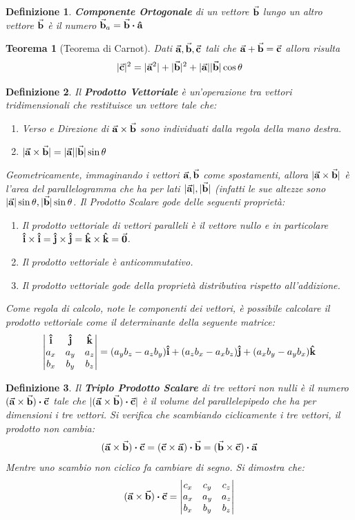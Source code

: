 \documentclass{article}
\newtheorem{thm}{Teorema}[section]
\newtheorem{defn}{Definizione}[section]
\renewcommand{\i}{\vu{i}}
\renewcommand{\j}{\vu{j}}
\renewcommand{\k}{\vu{k}}
\renewcommand{\a}{\va{a}}
\renewcommand{\b}{\va{b}}
\renewcommand{\c}{\va{c}}
\begin{document}
\begin{defn}
\textbf{Componente Ortogonale} di un vettore $\b$ lungo un altro vettore $\b$ è il numero $\b_a=\b\vdot\vu{a}$
\end{defn}

\begin{thm}[Teorema di Carnot]
Dati \(\a,\b,\c\) tali che \(\a+\b=\c\) allora risulta 
\[|\c|^2=|\a^2|+|\b|^2+|\a||\b|\cos\theta\]
\end{thm}

\begin{defn}
Il \textbf{Prodotto Vettoriale} è un'operazione tra vettori tridimensionali che restituisce un vettore tale che:
\begin{enumerate}
    \item Verso e Direzione di $\a\times\b$ sono individuati dalla regola della mano destra.
    \item \(|\a\times\b|=|\a||\b|\sin\theta\)
\end{enumerate}
Geometricamente, immaginando i vettori $\a,\b$ come spostamenti, allora $|\a\times\b|$ è l'area del parallelogramma che ha per lati $|\a|,|\b|$ (infatti le sue altezze sono $|\a|\sin\theta,|\b|\sin\theta$.
Il Prodotto Scalare gode delle seguenti proprietà:
\begin{enumerate}
    \item Il prodotto vettoriale di vettori paralleli è il vettore nullo e in particolare $\i\times\i=\j\times\j=\k\times\k=\va{0}$.
    \item Il prodotto vettoriale è anticommutativo.
    \item Il prodotto vettoriale gode della proprietà distributiva rispetto all'addizione.
\end{enumerate}


Come regola di calcolo, note le componenti dei vettori, è possibile calcolare il prodotto vettoriale come il determinante della seguente matrice:
\[\begin{vmatrix}\i&\j&\k\\ a_x&a_y&a_z\\b_x&b_y&b_z\\ \end{vmatrix}=(a_yb_z-a_zb_y)\i+(a_zb_x-a_xb_z)\j+(a_xb_y-a_yb_x)\k\]
\end{defn}

\begin{defn}
Il \textbf{Triplo Prodotto Scalare} di tre vettori non nulli è il numero $(\a\times\b)\vdot\c$ tale che $|(\a\times\b)\vdot\c|$ è il volume del parallelepipedo che ha per dimensioni i tre vettori. Si verifica che scambiando ciclicamente i tre vettori, il prodotto non cambia:
\[(\a\times\b)\vdot\c=(\c\times\a)\vdot\b=(\b\times\c)\vdot\a\]
Mentre uno scambio non ciclico fa cambiare di segno.
Si dimostra che:
\[(\a\times\b)\vdot\c=\begin{vmatrix}c_x&c_y&c_z\\ a_x&a_y&a_z\\b_x&b_y&b_z\\ \end{vmatrix}\]
\end{defn}
\end{document}
